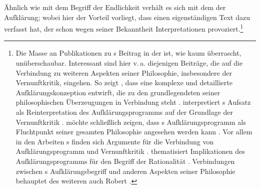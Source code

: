 Ähnlich wie mit dem Begriff der Endlichkeit verhält es sich mit dem der
Aufklärung; wobei hier der Vorteil vorliegt, dass  einen
eigenständigen Text dazu verfasst hat, der schon wegen seiner Bekanntheit
Interpretationen provoziert.\footnote{Die Masse an Publikationen zu s
Beitrag in der  ist, wie kaum überrascht,
unüberschaubar. Interessant sind hier v.\,a. diejenigen Beiträge, die auf die
Verbindung zu weiteren Aspekten seiner Philosophie, insbesondere der
Vernunftkritik, eingehen. So zeigt
, dass
 eine komplexe und detaillierte Aufklärungskonzeption
entwirft, die zu den grundlegendsten seiner philosophischen Überzeugungen in Verbindung steht
\parencite[vgl.][]{Allison:KantsConceptionofemphAufklaerung2012}.
 interpretiert
s Aufsatz als Reinterpretation des Aufklärungsprogramms auf
der Grundlage der Vernunftkritik
\parencite[vgl.][]{Schmidt:WhatEnlightenmentWas1992}.
 möchte schließlich zeigen,
dass s Aufklärungsprogramm als Fluchtpunkt seiner gesamten
Philosophie angesehen werden kann
\parencite[vgl.][]{Scholz:KantsAufklaerungsprogramm2009,Scholz:BeantwortungderFrage:WasisteinaufgeklaerteWeltbuerger2011}.
Vor allem in den Arbeiten s finden sich Argumente
für die Verbindung von Aufklärungsprogramm und Vernunftkritik
\parencite{Hinske:KantsVernunftkritik--FruchtderAufklaerungundoderWurzeldesDeutschenIdealismus1993,Hinske:ZwischenAufklaerungundVernunftkritik1998,Hinske:ZwischenAufklaerungundVernunftkritik1993}.
 thematisiert
Implikationen des Aufklärungsprogramms für den Begriff der Rationalität
\parencite[vgl.][]{LaRocca:WasAufklaerungseinwird2004}. Verbindungen zwischen
s Aufklärungsbegriff und anderen Aspekten seiner
Philosophie behauptet des weiteren auch Robert
\textcite[vgl.][]{Theis:KantetlAufklaerung2012}.
}

